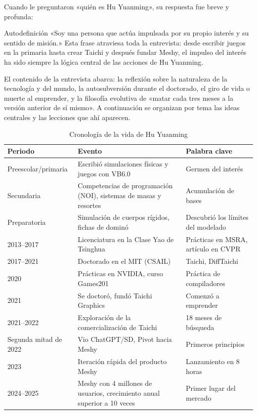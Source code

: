 \documentclass[a4paper]{article}
\begin{document}
Cuando le preguntaron «quién es Hu Yuanming», su respuesta fue breve y profunda:

\begin{importantbox}{Autodefinición}
«Soy una persona que actúa impulsada por su propio interés y su sentido de misión.» Esta frase atraviesa toda la entrevista: desde escribir juegos en la primaria hasta crear Taichi y después fundar Meshy, el impulso del interés ha sido siempre la lógica central de las acciones de Hu Yuanming.
\end{importantbox}

El contenido de la entrevista abarca: la reflexión sobre la naturaleza de la tecnología y del mundo, la autosubversión durante el doctorado, el giro de vida o muerte al emprender, y la filosofía evolutiva de «matar cada tres meses a la versión anterior de sí mismo». A continuación se organizan por tema las ideas centrales y las lecciones que ahí aparecen.

\begin{table}[H]
\centering
\caption{Cronología de la vida de Hu Yuanming}
\begin{tabular}{lll}
\toprule
\textbf{Periodo} & \textbf{Evento} & \textbf{Palabra clave} \\
\midrule
Preescolar/primaria & Escribió simulaciones físicas y juegos con VB6.0 & Germen del interés \\
Secundaria & Competencias de programación (NOI), sistemas de masas y resortes & Acumulación de bases \\
Preparatoria & Simulación de cuerpos rígidos, fichas de dominó & Descubrió los límites del modelado \\
2013--2017 & Licenciatura en la Clase Yao de Tsinghua & Prácticas en MSRA, artículo en CVPR \\
2017--2021 & Doctorado en el MIT (CSAIL) & Taichi, DiffTaichi \\
2020 & Prácticas en NVIDIA, curso Games201 & Práctica de compiladores \\
2021 & Se doctoró, fundó Taichi Graphics & Comenzó a emprender \\
2021--2022 & Exploración de la comercialización de Taichi & 18 meses de búsqueda \\
Segunda mitad de 2022 & Vio ChatGPT/SD, Pivot hacia Meshy & Primeros principios \\
2023 & Iteración rápida del producto Meshy & Lanzamiento en 8 horas \\
2024--2025 & Meshy con 4 millones de usuarios, crecimiento anual superior a 10 veces & Primer lugar del mercado \\
\bottomrule
\end{tabular}
\end{table}
\end{document}
